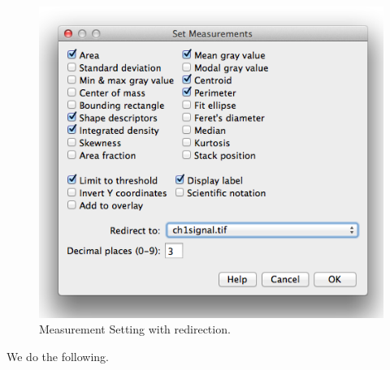 \begin{figure}[h!]
\begin{center}
\includegraphics[scale=0.5]{fig/SetMeasurementsRedirect.png}
\caption{Measurement Setting with redirection.}
\label{fig:MeasSettingRedirect}
\end{center}
\end{figure}


We do the following. 

